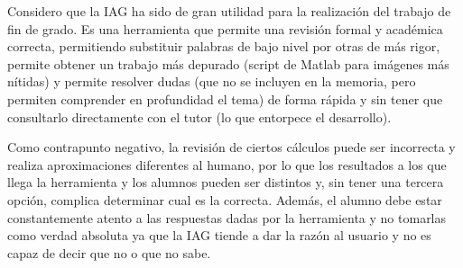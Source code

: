 \documentclass[12pt]{report} %
\begin{document}
\vspace{0.5em}
\noindent Considero que la IAG ha sido de gran utilidad para la realización del trabajo de fin de grado. Es una herramienta que permite una revisión formal y académica correcta, permitiendo substituir palabras de bajo nivel por otras de más rigor, permite obtener un trabajo más depurado (script de Matlab para imágenes más nítidas) y permite resolver dudas (que no se incluyen en la memoria, pero permiten comprender en profundidad el tema) de forma rápida y sin tener que consultarlo directamente con el tutor (lo que entorpece el desarrollo).

\vspace{0.5em}
\noindent Como contrapunto negativo, la revisión de ciertos cálculos puede ser incorrecta y realiza aproximaciones diferentes al humano, por lo que los resultados a los que llega la herramienta y los alumnos pueden ser distintos y, sin tener una tercera opción, complica determinar cual es la correcta. Además, el alumno debe estar constantemente atento a las respuestas dadas por la herramienta y no tomarlas como verdad absoluta ya que la IAG tiende a dar la razón al usuario y no es capaz de decir que no o que no sabe.
\end{document}
